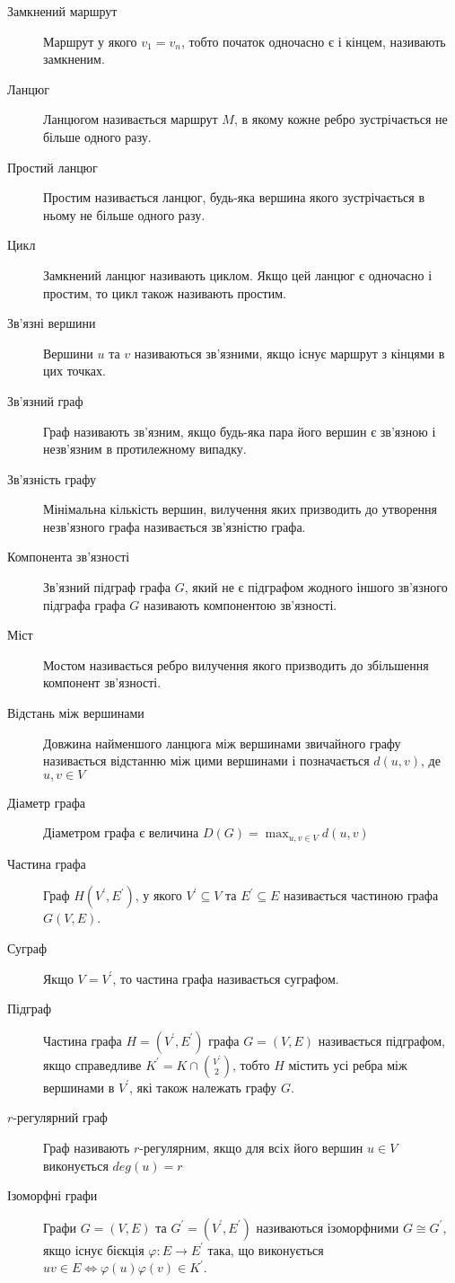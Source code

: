 \begin{description}
        \item[Замкнений маршрут] Маршрут у якого $v_1=v_n$, тобто початок одночасно є і кінцем, називають замкненим.
        \item[Ланцюг] Ланцюгом називається маршрут $M$, в якому кожне ребро зустрічається не більше одного разу.
        \item[Простий ланцюг] Простим називається ланцюг, будь-яка вершина якого зустрічається в ньому не більше одного разу.
        \item[Цикл] Замкнений ланцюг називають циклом. Якщо цей ланцюг є одночасно і простим, то цикл також називають простим.
        \item[Зв'язні вершини] Вершини $u$ та $v$ називаються зв'язними, якщо існує маршрут з кінцями в цих точках.
        \item[Зв'язний граф] Граф називають зв'язним, якщо будь-яка пара його вершин є зв'язною і незв'язним в протилежному випадку.
        \item[Зв'язність графу] Мінімальна кількість вершин, вилучення яких призводить до утворення незв'язного графа називається зв'язністю графа.
        \item[Компонента зв'язності] Зв'язний підграф графа $G$, який не є підграфом жодного іншого зв'язного підграфа графа $G$ називають компонентою зв'язності.
        \item[Міст] Мостом називається ребро вилучення якого призводить до збільшення компонент зв'язності.
        \item[Відстань між вершинами] Довжина найменшого ланцюга між вершинами звичайного графу називається відстанню між цими вершинами і позначається $d(u,v)$, де $u,v \in V$
        \item[Діаметр графа] Діаметром графа є величина $D(G) = \displaystyle{\max_{u,v \in V}d(u,v)}$
        \item[Частина графа] Граф $H(V^\prime,E^\prime)$, у якого $V^\prime \subseteq V$ та $E^\prime \subseteq E$ називається частиною графа $G(V,E)$.
        \item[Суграф] Якщо $V=V^\prime$, то частина графа називається суграфом.
        \item[Підграф] Частина графа $H=(V^\prime,E^\prime)$ графа $G=(V,E)$ називається підграфом, якщо справедливе $K^\prime=K\cap {V^\prime \choose 2}$, тобто $H$ містить усі ребра між вершинами в $V^\prime$, які також належать графу $G$.
        \item[$r$-регулярний граф] Граф називають $r$-регулярним, якщо для всіх його вершин $u \in V$ виконується $deg(u)=r$
        \item[Ізоморфні графи] Графи $G = (V,E)$ та $G^\prime = (V^\prime,E^\prime)$ називаються ізоморфними $G \cong G^\prime$, якщо існує бієкція $\varphi : E \to E^\prime$ така, що виконується $uv \in E \Leftrightarrow \varphi (u)\varphi (v) \in K^\prime$.
\end{description}
